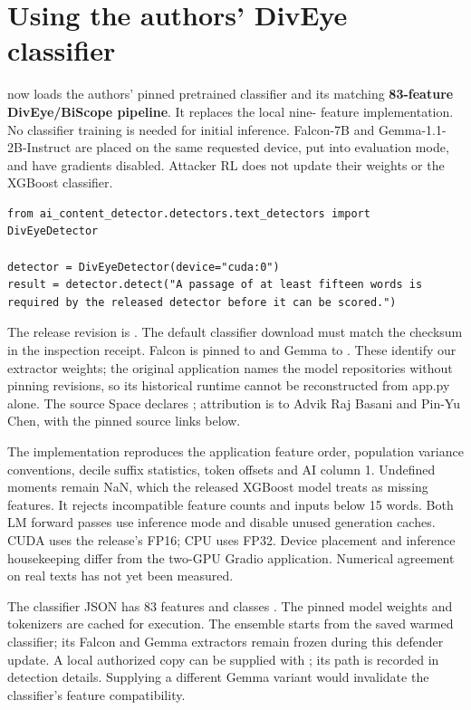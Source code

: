\section{Using the authors' DivEye
classifier}\label{record-docs-diveye-classifier-md-using-the-authors-diveye-classifier}

\texttt{} now loads the authors' pinned
pretrained classifier and its matching \textbf{83-feature DivEye/BiScope
pipeline}. It replaces the local nine- feature implementation. No
classifier training is needed for initial inference. Falcon-7B and
Gemma-1.1-2B-Instruct are placed on the same requested device, put into
evaluation mode, and have gradients disabled. Attacker RL does not
update their weights or the XGBoost classifier.

\begin{Verbatim}
from ai_content_detector.detectors.text_detectors import DivEyeDetector

detector = DivEyeDetector(device="cuda:0")
result = detector.detect("A passage of at least fifteen words is required by the released detector before it can be scored.")
\end{Verbatim}

The release revision is
\texttt{}. The
default classifier download must match the checksum in the inspection
receipt. Falcon is pinned to
\texttt{} and Gemma
to \texttt{}. These
identify our extractor weights; the original application names the model
repositories without pinning revisions, so its historical runtime cannot
be reconstructed from app.py alone. The source Space declares
\texttt{}; attribution is to Advik Raj Basani
and Pin-Yu Chen, with the pinned source links below.

The implementation reproduces the application feature order, population
variance conventions, decile suffix statistics, token offsets and AI
column 1. Undefined moments remain NaN, which the released XGBoost model
treats as missing features. It rejects incompatible feature counts and
inputs below 15 words. Both LM forward passes use inference mode and
disable unused generation caches. CUDA uses the release's FP16; CPU uses
FP32. Device placement and inference housekeeping differ from the
two-GPU Gradio application. Numerical agreement on real texts has not
yet been measured.

The classifier JSON has 83 features and classes
\texttt{\seqsplit{[0, 1]}}. The pinned model weights and tokenizers are
cached for execution. The ensemble starts from the saved warmed
classifier; its Falcon and Gemma extractors remain frozen during this
defender update. A local authorized copy can be supplied with
\texttt{}; its
path is recorded in detection details. Supplying a different Gemma
variant would invalidate the classifier's feature compatibility.

